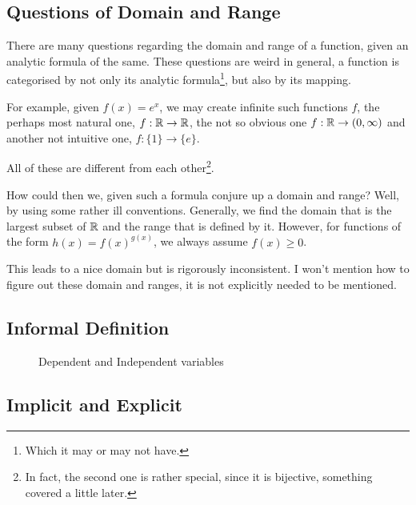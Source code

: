 \subsection{Questions of Domain and Range}

\irrev

There are many questions regarding the domain and range of a function, given an
analytic formula of the same. These questions are weird in general, a function
is categorised by not only its analytic formula\footnote{Which it may or may not have.}, 
but also by its mapping.

For example, given \(f(x) = e^x\), we may create infinite such functions \(f\),
the perhaps most natural one, \(f : \mathbb R \to \mathbb R\), the not so obvious
one \(f : \mathbb R \to (0, \infty)\) and another not intuitive one, \(f : \{1\} \to \{e\}\).

All of these are different from each other\footnote{In fact, the second
one is rather special, since it is bijective, something covered a little later.}.

How could then we, given such a formula conjure up a domain and range? Well, by using
some rather ill conventions. Generally, we find the domain that is the largest
subset of \(\mathbb R\) and the range that is defined by it. However, for 
functions of the form \(h(x) = f(x)^{g(x)}\), we always assume \(f(x) \ge 0\). 

This leads to a nice domain but is rigorously inconsistent. I won't 
mention how to figure out these domain and ranges, it is not explicitly needed
to be mentioned.

\subsection{Informal Definition}


\begin{figure}[H]
    \centering
    \caption{Dependent and Independent variables}
\end{figure}

\subsection{Implicit and Explicit}

